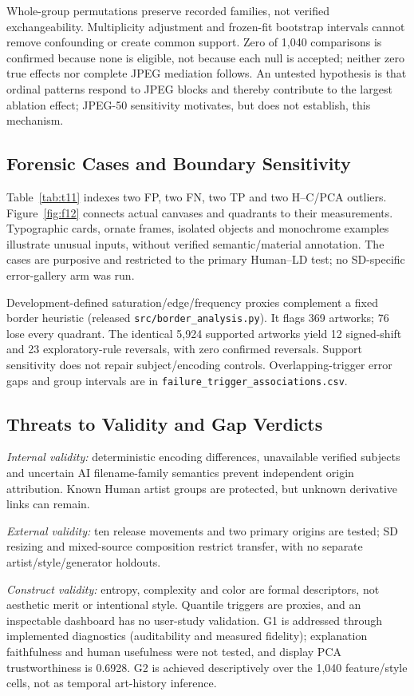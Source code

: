 \documentclass[journal,twoside,web]{IEEEtran}
\begin{document}
Whole-group permutations preserve recorded families, not verified exchangeability. Multiplicity adjustment and frozen-fit bootstrap intervals cannot remove confounding or create common support. Zero of 1,040 comparisons is confirmed because none is eligible, not because each null is accepted; neither zero true effects nor complete JPEG mediation follows. An untested hypothesis is that ordinal patterns respond to JPEG blocks and thereby contribute to the largest ablation effect; JPEG-50 sensitivity motivates, but does not establish, this mechanism.

\subsection{Forensic Cases and Boundary Sensitivity}
Table~\ref{tab:t11} indexes two FP, two FN, two TP and two H--C/PCA outliers. Figure~\ref{fig:f12} connects actual canvases and quadrants to their measurements. Typographic cards, ornate frames, isolated objects and monochrome examples illustrate unusual inputs, without verified semantic/material annotation. The cases are purposive and restricted to the primary Human--LD test; no SD-specific error-gallery arm was run.


Development-defined saturation/edge/frequency proxies complement a fixed border heuristic (released \texttt{src/border\_analysis.py}). It flags 369 artworks; 76 lose every quadrant. The identical 5,924 supported artworks yield 12 signed-shift and 23 exploratory-rule reversals, with zero confirmed reversals. Support sensitivity does not repair subject/encoding controls. Overlapping-trigger error gaps and group intervals are in \texttt{failure\_trigger\_associations.csv}.

\subsection{Threats to Validity and Gap Verdicts}
\textit{Internal validity:} deterministic encoding differences, unavailable verified subjects and uncertain AI filename-family semantics prevent independent origin attribution. Known Human artist groups are protected, but unknown derivative links can remain.

\textit{External validity:} ten release movements and two primary origins are tested; SD resizing and mixed-source composition restrict transfer, with no separate artist/style/generator holdouts.

\textit{Construct validity:} entropy, complexity and color are formal descriptors, not aesthetic merit or intentional style. Quantile triggers are proxies, and an inspectable dashboard has no user-study validation. G1 is addressed through implemented diagnostics (auditability and measured fidelity); explanation faithfulness and human usefulness were not tested, and display PCA trustworthiness is 0.6928. G2 is achieved descriptively over the 1,040 feature/style cells, not as temporal art-history inference.
\end{document}
